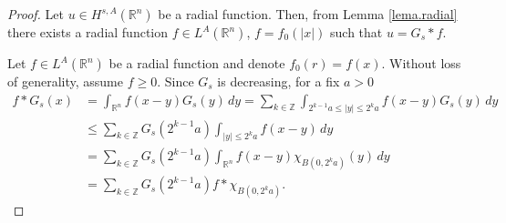 \documentclass[leqno,twoside, 12pt]{amsart}
\theoremstyle{plain}
\numberwithin{equation}{section} \numberwithin{figure}{section}
\theoremstyle{definition}
\newcommand{\R}{\mathbb R}
\numberwithin{equation}{section}
\begin{document}
\begin{proof}
Let $u\in H^{s,A}(\R^n)$ be a radial function. Then, from Lemma \ref{lema.radial} there exists a radial function  $f\in L^A(\R^n)$, $f=f_0(|x|)$ such that $u=G_s*f$.


Let $f\in L^A(\R^n)$ be a radial function and denote $f_0(r)=f(x)$. Without loss of generality, assume $f\geq 0$. Since $G_s$ is decreasing, for a fix $a>0$ 
\begin{align*}
f*G_s(x) &= \int_{\R^n} f(x-y)G_s(y)\,dy=\sum_{k\in \mathbb{Z}} \int_{2^{k-1}a \leq |y|\leq 2^k a} f(x-y)G_s(y)\,dy\\
&\leq \sum_{k\in \mathbb{Z}}  G_s(2^{k-1}a ) \int_{ |y|\leq 2^k a} f(x-y)\,dy\\
&= \sum_{k\in \mathbb{Z}}  G_s(2^{k-1}a ) \int_{\R^n} f(x-y)\chi_{B(0,2^ka)}(y)\,dy\\
&= \sum_{k\in \mathbb{Z}}  G_s(2^{k-1}a )  f*\chi_{B(0,2^ka)}.
\end{align*}



\end{proof}
\end{document}
